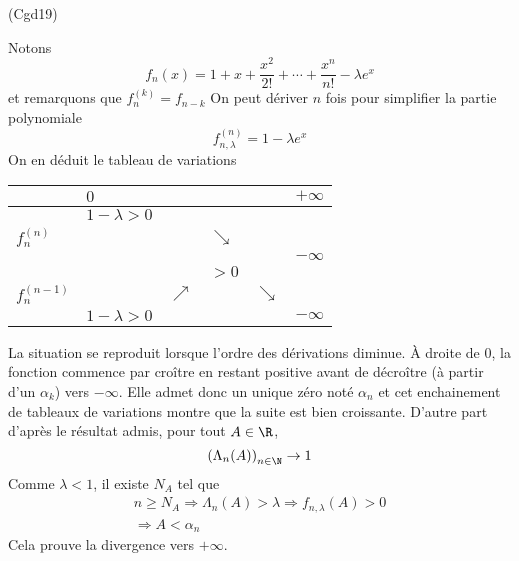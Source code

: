 \begin{tiny}(Cgd19)\end{tiny} Notons
\begin{displaymath}
 f_{n}(x) = 1 +x + \frac{x^2}{2!}+\cdots+\frac{x^n}{n!}-\lambda e^x
\end{displaymath}
et remarquons que $f_{n}^{(k)} =f_{n-k}$
On peut dériver $n$ fois pour simplifier la partie polynomiale
\begin{displaymath}
 f_{n,\lambda}^{(n)} = 1-\lambda e^x 
\end{displaymath}
On en déduit le tableau de variations
\begin{center}
\begin{tabular}{l|lllll}
                & $0$           &            &            &           & $+\infty$ \\\hline
                & $1-\lambda>0$ &            &            &           &           \\
$f_{n}^{(n)}$   &               &            & $\searrow$ &           &            \\
                &               &            &            &           & $-\infty$  \\ \hline
                &               &            & $>0$       &           &  \\
$f_{n}^{(n-1)}$ &               & $\nearrow$ &            &$\searrow$ &  \\
                & $1-\lambda>0$ &            &            &           & $-\infty$
\end{tabular}
\end{center}
La situation se reproduit lorsque l'ordre des dérivations diminue. \`A droite de $0$, la fonction commence par croître en restant positive avant de décroître (à partir d'un $\alpha_k$) vers $-\infty$. Elle admet donc un unique zéro noté $\alpha_n$ et cet enchainement de tableaux de variations montre que la suite est bien croissante. D'autre part d'après le résultat admis, pour tout $A\in \R$,
\begin{displaymath}
 \left( \Lambda_n(A)\right) _{n\in \N} \rightarrow 1
\end{displaymath}
Comme $\lambda <1$, il existe $N_A$ tel que 
\begin{multline*}
 n\geq N_A \Rightarrow \Lambda_n(A) > \lambda \Rightarrow f_{n,\lambda}(A)>0\\
\Rightarrow A< \alpha_n
\end{multline*}
Cela prouve la divergence vers $+\infty$.
